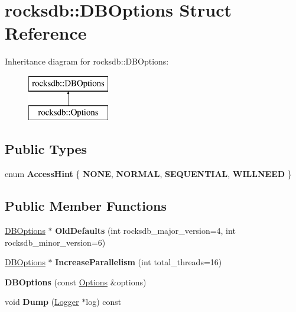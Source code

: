 \hypertarget{structrocksdb_1_1DBOptions}{}\section{rocksdb\+:\+:D\+B\+Options Struct Reference}
\label{structrocksdb_1_1DBOptions}
Inheritance diagram for rocksdb\+:\+:D\+B\+Options\+:\begin{figure}[H]
\begin{center}
\leavevmode
\includegraphics[height=2.000000cm]{structrocksdb_1_1DBOptions}
\end{center}
\end{figure}
\subsection*{Public Types}
\begin{DoxyCompactItemize}
\item 
enum {\bfseries Access\+Hint} \{ {\bfseries N\+O\+NE}, 
{\bfseries N\+O\+R\+M\+AL}, 
{\bfseries S\+E\+Q\+U\+E\+N\+T\+I\+AL}, 
{\bfseries W\+I\+L\+L\+N\+E\+ED}
 \}\hypertarget{structrocksdb_1_1DBOptions_a4c0ee6860de664497ef1da15d1df2f11}{}\label{structrocksdb_1_1DBOptions_a4c0ee6860de664497ef1da15d1df2f11}

\end{DoxyCompactItemize}
\subsection*{Public Member Functions}
\begin{DoxyCompactItemize}
\item 
\hyperlink{structrocksdb_1_1DBOptions}{D\+B\+Options} $\ast$ {\bfseries Old\+Defaults} (int rocksdb\+\_\+major\+\_\+version=4, int rocksdb\+\_\+minor\+\_\+version=6)\hypertarget{structrocksdb_1_1DBOptions_a5a227d520fc66dd3836a69fe32e225e8}{}\label{structrocksdb_1_1DBOptions_a5a227d520fc66dd3836a69fe32e225e8}

\item 
\hyperlink{structrocksdb_1_1DBOptions}{D\+B\+Options} $\ast$ {\bfseries Increase\+Parallelism} (int total\+\_\+threads=16)\hypertarget{structrocksdb_1_1DBOptions_ab0db4bd149b283e652862784715da0d6}{}\label{structrocksdb_1_1DBOptions_ab0db4bd149b283e652862784715da0d6}

\item 
{\bfseries D\+B\+Options} (const \hyperlink{structrocksdb_1_1Options}{Options} \&options)\hypertarget{structrocksdb_1_1DBOptions_a75ada8388a24596c5e4aa1bc9bac4b39}{}\label{structrocksdb_1_1DBOptions_a75ada8388a24596c5e4aa1bc9bac4b39}

\item 
void {\bfseries Dump} (\hyperlink{classrocksdb_1_1Logger}{Logger} $\ast$log) const\hypertarget{structrocksdb_1_1DBOptions_a8068fb42d793c7a567bc44e5aed50844}{}\label{structrocksdb_1_1DBOptions_a8068fb42d793c7a567bc44e5aed50844}

\end{DoxyCompactItemize}
